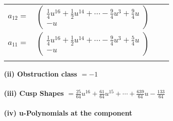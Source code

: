 \documentclass[1p]{elsarticle_modified}
\theoremstyle{definition}
\begin{document}
\begin{tabular}{m{7pt} m{180pt} m{7pt} m{180pt} }
\flushright $a_{12}=$&$\begin{pmatrix}\frac{1}{4} u^{16}+\frac{1}{2} u^{14}+\cdots-\frac{9}{4} u^3+\frac{9}{4} u\\- u\end{pmatrix}$ \\
\flushright $a_{11}=$&$\begin{pmatrix}\frac{1}{4} u^{16}+\frac{1}{2} u^{14}+\cdots-\frac{9}{4} u^3+\frac{5}{4} u\\- u\end{pmatrix}$\\&\end{tabular}
\flushleft \textbf{(ii) Obstruction class $= -1$}\\~\\
\flushleft \textbf{(iii) Cusp Shapes $= \frac{25}{64} u^{16}+\frac{61}{64} u^{15}+\cdots+\frac{639}{64} u-\frac{133}{64}$}\\~\\
\newpage\renewcommand{\arraystretch}{1}
\flushleft \textbf{(iv) u-Polynomials at the component}\newline \\
\end{document}
